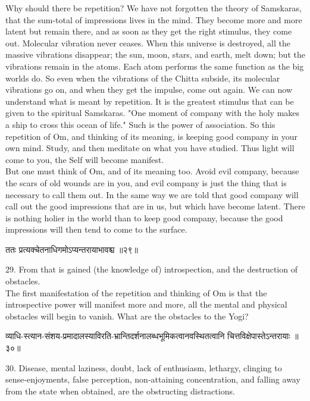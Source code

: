 Why should there be repetition? We have not forgotten the
theory of Samskaras, that the sum-total of
impressions lives in the mind. They become more and more latent but
remain there, and as soon as they get the right stimulus, they come
out. Molecular vibration never ceases. When this universe is destroyed,
all the massive vibrations disappear; the sun, moon, stars, and earth,
melt down; but the vibrations remain in the atoms. Each atom performs
the same function as the big worlds do. So even when the vibrations of
the Chitta subside, its molecular vibrations go on, and when they get
the impulse, come out again. We can now understand what is meant by
repetition. It is the greatest stimulus that can be given to the
spiritual Samskaras. "One moment of company with the holy makes a ship
to cross this ocean of life." Such is the power of association. So this
repetition of Om, and thinking of its meaning, is keeping good company
in your own mind. Study, and then meditate on what you have studied.
Thus light will come to you, the Self will become manifest. \\

But one must think of Om, and of its meaning too. Avoid evil
company, because the scars of old wounds are in you, and evil company
is just the thing that is necessary to call them out. In the same way
we are told that good company will call out the good impressions that
are in us, but which have become latent. There is nothing holier in the
world than to keep good company, because the good impressions will then
tend to come to the surface. \\

\begin{center}
\begin{sanskrit}
ततः प्रत्यक्चेतनाधिगमोऽप्यन्तरायाभावश्च ॥२९॥
\end{sanskrit}
\end{center}
29. From that is gained (the knowledge of) introspection, and
the destruction of obstacles. \\

The first manifestation of the repetition and thinking of Om
is that the introspective power will manifest more and more, all the
mental and physical obstacles will begin to vanish. What are the
obstacles to the Yogi? \\

\begin{center}
\begin{sanskrit}
व्याधि-स्त्यान-संशय-प्रमादालस्याविरति-भ्रान्तिदर्शनालब्धभूमिकत्वानवस्थितत्वानि
चित्तविक्षेपास्तेऽन्तरायाः ॥३०॥
\end{sanskrit}
\end{center}
30. Disease, mental laziness, doubt, lack of enthusiasm,
lethargy, clinging to sense-enjoyments, false perception, non-attaining
concentration, and falling away from the state when obtained, are the
obstructing distractions.\\

